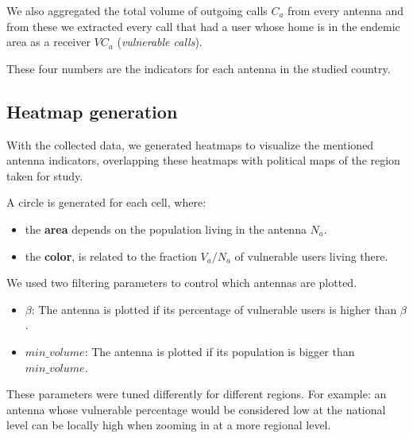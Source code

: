     We also aggregated the total volume of outgoing calls $C_a$ from every antenna and from these we extracted every call that had a user whose home is in the endemic area as a receiver $VC_a$ (\textit{vulnerable calls}).
    
    These four numbers are the indicators for each antenna in the studied country.

\subsection{Heatmap generation}
    With the collected data, we generated heatmaps to visualize the mentioned antenna indicators, overlapping these heatmaps with political maps of the region taken for study.
    
	A circle is generated for each cell, where:
	\begin{itemize}
		\item the \textbf{area} depends on the population living in the antenna $N_a$.
		\item the \textbf{color}, is related to the fraction ${V_a}/{N_a}$ of vulnerable users living there.
	\end{itemize}
    
    We used two filtering parameters to control which antennas are plotted.
    \begin{itemize}
        \item $\beta$: The antenna is plotted if its percentage of vulnerable users is higher than $\beta$.
        \item $min\_volume$: The antenna is plotted if its population is bigger than $min\_volume$.
    \end{itemize}
    
    These parameters were tuned differently for different regions. For example: an antenna whose vulnerable percentage would be considered low at the national level can be locally high when zooming in at a more regional level.
    